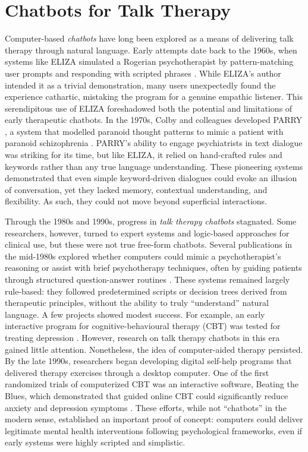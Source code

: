 \section{Chatbots for Talk Therapy}
Computer-based \emph{chatbots} have long been explored as a means of delivering talk therapy through natural language. Early attempts date back to the 1960s, when systems like ELIZA simulated a Rogerian psychotherapist by pattern-matching user prompts and responding with scripted phrases \cite{Weizenbaum1966}. While ELIZA’s author intended it as a trivial demonstration, many users unexpectedly found the experience cathartic, mistaking the program for a genuine empathic listener. This serendipitous use of ELIZA foreshadowed both the potential and limitations of early therapeutic chatbots. In the 1970s, Colby and colleagues developed PARRY \cite{10.5555/212154.212175}, a system that modelled paranoid thought patterns to mimic a patient with paranoid schizophrenia \cite{Colby1971}. PARRY’s ability to engage psychiatrists in text dialogue was striking for its time, but like ELIZA, it relied on hand-crafted rules and keywords rather than any true language understanding. These pioneering systems demonstrated that even simple keyword-driven dialogues could evoke an illusion of conversation, yet they lacked memory, contextual understanding, and flexibility. As such, they could not move beyond superficial interactions.


Through the 1980s and 1990s, progress in \emph{talk therapy chatbots} stagnated. Some researchers, however, turned to expert systems and logic-based approaches for clinical use, but these were not true free-form chatbots. Several publications in the mid-1980s explored whether computers could mimic a psychotherapist’s reasoning or assist with brief psychotherapy techniques, often by guiding patients through structured question-answer routines \cite{Hartman1986,Sampson1986,ServanSchreiber1986}. These systems remained largely rule-based: they followed predetermined scripts or decision trees derived from therapeutic principles, without the ability to truly “understand” natural language. A few projects showed modest success. For example, an early interactive program for cognitive-behavioural therapy (CBT) was tested for treating depression \cite{Selmi1990}. However, research on talk therapy chatbots in this era gained little attention. Nonetheless, the idea of computer-aided therapy persisted. By the late 1990s, researchers began developing digital self-help programs that delivered therapy exercises through a desktop computer. One of the first randomized trials of computerized CBT was an interactive software, Beating the Blues, which demonstrated that guided online CBT could significantly reduce anxiety and depression symptoms \cite{Proudfoot2003}. These efforts, while not “chatbots” in the modern sense, established an important proof of concept: computers could deliver legitimate mental health interventions following psychological frameworks, even if early systems were highly scripted and simplistic.


